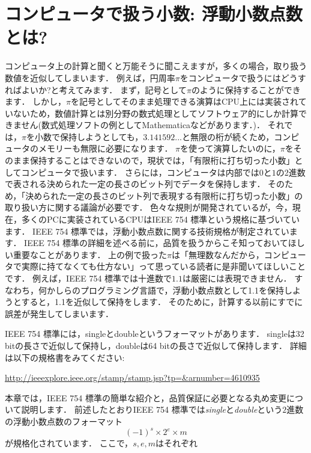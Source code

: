 \section{コンピュータで扱う小数: 浮動小数点数とは?}
コンピュータ上の計算と聞くと万能そうに聞こえますが，多くの場合，取り扱う数値を近似してしまいます．
例えば，円周率$\pi$をコンピュータで扱うにはどうすればよいか?と考えてみます．
まず，記号として$\pi$のように保持することができます．
しかし，$\pi$を記号としてそのまま処理できる演算はCPU上には実装されていないため，数値計算とは別分野の数式処理としてソフトウェア的にしか計算できません(数式処理ソフトの例としてMathematicaなどがあります．)．
それでは，$\pi$を小数で保持しようとしても，$3.141592...$と無限の桁が続くため，コンピュータのメモリーも無限に必要になります．
$\pi$を使って演算したいのに，$\pi$をそのまま保持することはできないので，現状では，「有限桁に打ち切った小数」としてコンピュータで扱います．
さらには，コンピュータは内部では$0$と$1$の2進数で表される決められた一定の長さのビット列でデータを保持します．
そのため，「決められた一定の長さのビット列で表現する有限桁に打ち切った小数」の取り扱い方に関する議論が必要です．
色々な規則が開発されているが，今，現在，多くのPCに実装されているCPUはIEEE 754 標準という規格に基づいています．
IEEE 754 標準では，浮動小数点数に関する技術規格が制定されています．
IEEE 754 標準の詳細を述べる前に，品質を扱うからこそ知っておいてほしい重要なことがあります．
上の例で扱った$\pi$は「無理数なんだから，コンピュータで実際に持てなくても仕方ない」って思っている読者に是非聞いてほしいことです．
例えば，IEEE 754 標準では十進数で$1.1$は厳密には表現できません．
すなわち，何かしらのプログラミング言語で，浮動小数点数として1.1を保持しようとすると，1.1を近似して保持をします．
そのために，計算する以前にすでに誤差が発生してしまいます．


IEEE 754 標準には，singleとdoubleというフォーマットがあります．
singleは32 bitの長さで近似して保持し，doubleは64 bitの長さで近似して保持します．
詳細は以下の規格書をみてください:

\begin{center}
{\small\url{http://ieeexplore.ieee.org/stamp/stamp.jsp?tp=&arnumber=4610935}}
\end{center}

本章では，IEEE 754 標準の簡単な紹介と，品質保証に必要となる丸め変更について説明します．
前述したとおりIEEE 754 標準では\textit{single}と\textit{double}という$2$進数の浮動小数点数のフォーマット
\[
	(-1)^s \times 2^e \times m
\]
が規格化されています．
ここで，$s, e, m$はそれぞれ

